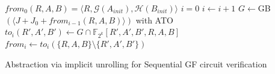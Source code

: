 \vspace{-0.1in}
\IncMargin{1em}
\begin{algorithm}[hbt]
\SetAlgoNoLine
\LinesNumbered

  $from_0(R,A,B) = \langle R, \mathcal{G}(A_{init}), \mathcal{H}(B_{init})\rangle$\;
  $i = 0$\;
  {
  	$i \gets i + 1$\;
	$G \gets$GB$( \langle J + J_0+ from_{i-1}(R,A,B) \rangle
    )$ with ATO\;
	$to_i(R',A',B')\gets G\cap \mathbb F_{2^k}[R',A',B',R,A,B]$\;
	$from_i \gets to_i(\{R,A,B\}\setminus \{R',A',B'\})$\;
  }
\caption {Abstraction via implicit unrolling for Sequential GF circuit
  verification}
\label{alg:modified}
\end{algorithm}
\DecMargin{1em}
\vspace{-0.1in}
